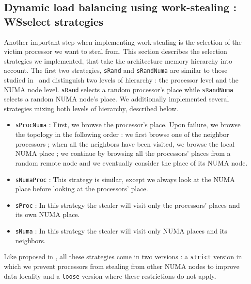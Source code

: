 \subsection{Dynamic load balancing using work-stealing : WSselect strategies}
\label{sec:ws_select}

Another important step when implementing work-stealing is the selection of the victim processor we want to steal from.
This section describes the selection strategies we implemented, that take the architecture memory hierarchy into account.
The first two strategies, \verb!sRand! and \verb!sRandNuma! are similar to those studied in~\cite{DBLP:journals/ijhpca/OlivierPWSP12}
and distinguish two levels of hierarchy : the processor level and the NUMA node level.
\verb/sRand/ selects a random processor's place while \verb/sRandNuma/ selects a random NUMA node's place.
We additionally implemented several strategies mixing both levels of hierarchy,
described below.

\begin{itemize}
  \item \verb/sProcNuma/ : First, we browse the processor's place. Upon failure, we browse the topology in the following order : we first browse one of the neighbor processors ; when all the neighbors have been visited, we browse the local NUMA place ; we continue by browsing all the processors' places from a random remote node and we eventually consider the place of its NUMA node.
  \item \verb/sNumaProc/ : This strategy is similar, except we always look at the
    NUMA place before looking at the processors' place.
  \item \verb/sProc/ : In this strategy the stealer will visit only the
    processors' places and its own NUMA place.
  \item \verb/sNuma/ : In this strategy the stealer will visit only NUMA places
    and its neighbors. 
\end{itemize}

Like proposed in \cite{Olivier:2012:CMW:2388996.2389085}, all these strategies come in two versions : a \verb!strict! version in which we prevent processors from stealing from other NUMA nodes to improve data locality and a \verb!loose! version where these restrictions do not apply.

